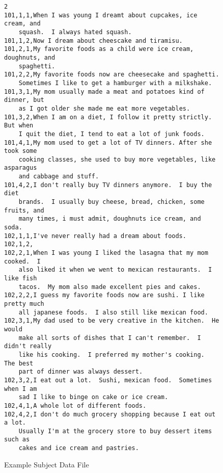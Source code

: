 \documentclass[11pt]{article}
\numberwithin{figure}{section}
\numberwithin{table}{section}
\begin{document}
\newpage\begin{figure}
\label{fig:sampsubjdatafile}
\caption{Example Subject Data File}
\small
\begin{verbatim}
2
101,1,1,When I was young I dreamt about cupcakes, ice cream, and 
    squash.  I always hated squash.
101,1,2,Now I dream about cheescake and tiramisu.
101,2,1,My favorite foods as a child were ice cream, doughnuts, and 
    spaghetti.
101,2,2,My favorite foods now are cheesecake and spaghetti.  
    Sometimes I like to get a hamburger with a milkshake.
101,3,1,My mom usually made a meat and potatoes kind of dinner, but 
    as I got older she made me eat more vegetables.
101,3,2,When I am on a diet, I follow it pretty strictly.  But when 
    I quit the diet, I tend to eat a lot of junk foods.
101,4,1,My mom used to get a lot of TV dinners. After she took some 
    cooking classes, she used to buy more vegetables, like asparagus 
    and cabbage and stuff.
101,4,2,I don't really buy TV dinners anymore.  I buy the diet 
    brands.  I usually buy cheese, bread, chicken, some fruits, and 
    many times, i must admit, doughnuts ice cream, and soda.
102,1,1,I've never really had a dream about foods.
102,1,2,
102,2,1,When I was young I liked the lasagna that my mom cooked.  I 
    also liked it when we went to mexican restaurants.  I like fish 
    tacos.  My mom also made excellent pies and cakes.
102,2,2,I guess my favorite foods now are sushi. I like pretty much 
    all japanese foods.  I also still like mexican food.
102,3,1,My dad used to be very creative in the kitchen.  He would 
    make all sorts of dishes that I can't remember.  I didn't really 
    like his cooking.  I preferred my mother's cooking.  The best 
    part of dinner was always dessert.
102,3,2,I eat out a lot.  Sushi, mexican food.  Sometimes when I am 
    sad I like to binge on cake or ice cream.
102,4,1,A whole lot of different foods.
102,4,2,I don't do much grocery shopping because I eat out a lot. 
    Usually I'm at the grocery store to buy dessert items such as 
    cakes and ice cream and pastries.
\end{verbatim}
\end{figure}
\end{document}
